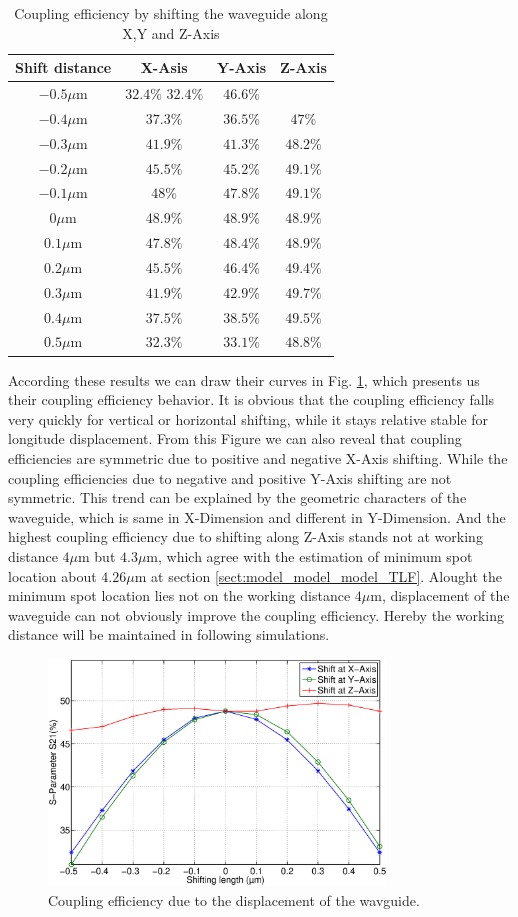 \begin{table}
\caption{Coupling efficiency by shifting the waveguide along X,Y and Z-Axis}
\centering
\begin{tabular}{c|ccc}
\hline
Shift distance & X-Asis & Y-Axis & Z-Axis \\
\hline
$-0.5\mu$m 		&$32.4\%$	$32.4\%$&$46.6\%$	\\
$-0.4\mu$m		&$37.3\%$	&$36.5\%$&$47\%$	\\
$-0.3\mu$m 		&$41.9\%$	&$41.3\%$&$48.2\%$	\\
$-0.2\mu$m	  &$45.5\%$	&$45.2\%$&$49.1\%$	\\
$-0.1\mu$m		&$48\%$	&$47.8\%$&$49.1\%$	\\
$0\mu$m			  &$48.9\%$	&$48.9\%$&$48.9\%$	\\
$0.1\mu$m			&$47.8\%$	&$48.4\%$&$48.9\%$	\\
$0.2\mu$m			&$45.5\%$	&$46.4\%$&$49.4\%$	\\
$0.3\mu$m			&$41.9\%$	&$42.9\%$&$49.7\%$	\\
$0.4\mu$m			&$37.5\%$	&$38.5\%$&$49.5\%$	\\
$0.5\mu$m			&$32.3\%$	&$33.1\%$&$48.8\%$	\\
\hline
\end{tabular}
\label{tab:shift_result}
\end{table}
According these results we can draw their curves in Fig. \ref{fig:shift_curve}, which presents us their coupling efficiency behavior. It is obvious that the coupling efficiency falls very quickly for vertical or horizontal shifting, while it stays relative stable for longitude displacement. From this Figure we can also reveal that coupling efficiencies are symmetric due to positive and negative X-Axis shifting. While the coupling efficiencies due to negative and positive Y-Axis shifting are not symmetric. This trend can be explained by the geometric characters of the waveguide, which is same in X-Dimension and different in Y-Dimension. And the highest coupling efficiency due to shifting along Z-Axis stands not at working distance $4\mu$m but $4.3\mu$m, which agree with the estimation of minimum spot location about $4.26\mu$m at section \ref{sect:model_model_model_TLF}. Alought the minimum spot location lies not on the working distance $4\mu$m, displacement of the waveguide can not obviously improve the coupling efficiency. Hereby the working distance will be maintained in following simulations.
  
\begin{figure}[!ht]
\centering
\includegraphics[width=0.8\textwidth]{bilder/shift_curve}
\caption{Coupling efficiency due to the displacement of the wavguide.}
\label{fig:shift_curve}
\end{figure}
